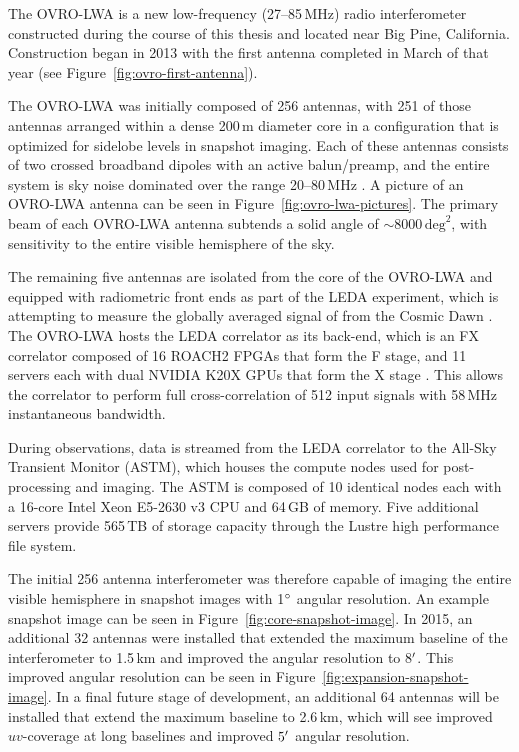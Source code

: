\begin{bibunit}
The OVRO-LWA is a new low-frequency (27--85\,MHz) radio interferometer constructed during the course
of this thesis and located near Big Pine, California. Construction began in 2013 with the first
antenna completed in March of that year (see Figure~\ref{fig:ovro-first-antenna}).

The OVRO-LWA was initially composed of 256 antennas, with 251 of those antennas arranged within a
dense 200\,m diameter core in a configuration that is optimized for sidelobe levels in snapshot
imaging.  Each of these antennas consists of two crossed broadband dipoles with an active
balun/preamp, and the entire system is sky noise dominated over the range 20--80\,MHz
\citep{2012PASP..124.1090H}.  A picture of an OVRO-LWA antenna can be seen in
Figure~\ref{fig:ovro-lwa-pictures}. The primary beam of each OVRO-LWA antenna subtends a solid angle
of $\sim 8000\,\text{deg}^2$, with sensitivity to the entire visible hemisphere of the sky.


The remaining five antennas are isolated from the core of the OVRO-LWA and equipped with radiometric
front ends as part of the LEDA experiment, which is attempting to measure the globally averaged
signal of  from the Cosmic Dawn \citep{2018MNRAS.478.4193P}.  The OVRO-LWA hosts the LEDA
correlator as its back-end, which is an FX correlator composed of 16 ROACH2 FPGAs that form the F
stage, and 11 servers each with dual NVIDIA K20X GPUs that form the X stage
\citep{2015JAI.....450003K}. This allows the correlator to perform full cross-correlation of 512
input signals with 58\,MHz instantaneous bandwidth.

During observations, data is streamed from the LEDA correlator to the All-Sky Transient Monitor
(ASTM), which houses the compute nodes used for post-processing and imaging.  The ASTM is composed
of 10 identical nodes each with a 16-core Intel Xeon E5-2630 v3 CPU and 64\,GB of memory. Five
additional servers provide 565\,TB of storage capacity through the Lustre high performance file
system.

The initial 256 antenna interferometer was therefore capable of imaging the entire visible
hemisphere in snapshot images with 1$\mbox{$^\circ$}$ angular resolution. An example snapshot image can be
seen in Figure~\ref{fig:core-snapshot-image}.  In 2015, an additional 32 antennas were installed
that extended the maximum baseline of the interferometer to 1.5\,km and improved the angular
resolution to 8$\mbox{$^\prime$}$. This improved angular resolution can be seen in
Figure~\ref{fig:expansion-snapshot-image}. In a final future stage of development, an additional 64
antennas will be installed that extend the maximum baseline to 2.6\,km, which will see improved
$uv$-coverage at long baselines and improved $5\mbox{$^\prime$}$ angular resolution.


\end{bibunit}
